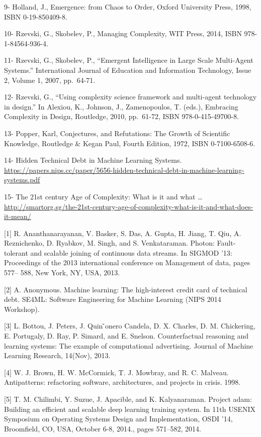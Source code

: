\documentclass[]{article}
\begin{document}
9- Holland, J., Emergence: from Chaos to Order, Oxford University Press,
1998, ISBN 0-19-850409-8.

10- Rzevski, G., Skobelev, P., Managing Complexity, WIT Press, 2014,
ISBN 978-1-84564-936-4.

11- Rzevski, G., Skobelev, P., ``Emergent Intelligence in Large Scale
Multi-Agent Systems.'' International Journal of Education and
Information Technology, Issue 2, Volume 1, 2007, pp.~64-71.

12- Rzevski, G., ``Using complexity science framework and multi-agent
technology in design.'' In Alexiou, K., Johnson, J., Zamenopoulos, T.
(eds.), Embracing Complexity in Design, Routledge, 2010, pp.~61-72, ISBN
978-0-415-49700-8.

13- Popper, Karl, Conjectures, and Refutations: The Growth of Scientific
Knowledge, Routledge \& Kegan Paul, Fourth Edition, 1972, ISBN
0-7100-6508-6.

14- Hidden Technical Debt in Machine Learning Systems.
\url{https://papers.nips.cc/paper/5656-hidden-technical-debt-in-machine-learning-systems.pdf}

15- The 21st century Age of Complexity: What is it and what \ldots{}
\url{http://smartorg.sg/the-21st-century-age-of-complexity-what-is-it-and-what-does-it-mean/}

{[}1{]} R. Ananthanarayanan, V. Basker, S. Das, A. Gupta, H. Jiang, T.
Qiu, A. Reznichenko, D. Ryabkov, M. Singh, and S. Venkataraman. Photon:
Fault-tolerant and scalable joining of continuous data streams. In
SIGMOD '13: Proceedings of the 2013 international conference on
Management of data, pages 577-- 588, New York, NY, USA, 2013.

{[}2{]} A. Anonymous. Machine learning: The high-interest credit card of
technical debt. SE4ML: Software Engineering for Machine Learning (NIPS
2014 Workshop).

{[}3{]} L. Bottou, J. Peters, J. Quin ̃onero Candela, D. X. Charles, D.
M. Chickering, E. Portugaly, D. Ray, P. Simard, and E. Snelson.
Counterfactual reasoning and learning systems: The example of
computational advertising. Journal of Machine Learning Research,
14(Nov), 2013.

{[}4{]} W. J. Brown, H. W. McCormick, T. J. Mowbray, and R. C. Malveau.
Antipatterns: refactoring software, architectures, and projects in
crisis. 1998.

{[}5{]} T. M. Chilimbi, Y. Suzue, J. Apacible, and K. Kalyanaraman.
Project adam: Building an efficient and scalable deep learning training
system. In 11th USENIX Symposium on Operating Systems Design and
Implementation, OSDI '14, Broomfield, CO, USA, October 6-8, 2014., pages
571--582, 2014.
\end{document}
